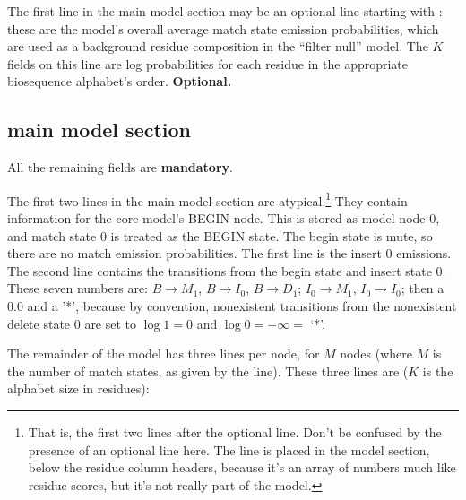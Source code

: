 \begin{sreitems}{}
\item [\monob{COMPO <f>*K}] The first line in the main model section
may be an optional line starting with : these are the
model's overall average match state emission probabilities, which are
used as a background residue composition in the ``filter null''
model. The $K$ fields on this line are log probabilities for each
residue in the appropriate biosequence alphabet's
order. \textbf{Optional.}

\end{sreitems}

\subsection{main model section}

All the remaining fields are \textbf{mandatory}.

The first two lines in the main model section are
atypical.\footnote{That is, the first two lines after the optional
   line. Don't be confused by the presence of an optional 
  line here. The  line is placed in the model section, below the
  residue column headers, because it's an array of numbers much like
  residue scores, but it's not really part of the model.}  They
contain information for the core model's BEGIN node. This is stored as
model node 0, and match state 0 is treated as the BEGIN state.  The
begin state is mute, so there are no match emission probabilities. The
first line is the insert 0 emissions. The second line contains the
transitions from the begin state and insert state 0.  These seven
numbers are: $B \rightarrow M_1$, $B \rightarrow I_0$, $B \rightarrow
D_1$; $I_0 \rightarrow M_1$, $I_0 \rightarrow I_0$; then a 0.0 and a
'*', because by convention, nonexistent transitions from the
nonexistent delete state 0 are set to $\log 1 = 0$ and $\log 0 =
-\infty = $ `*'.

The remainder of the model has three lines per node, for $M$ nodes
(where $M$ is the number of match states, as given by the 
line). These three lines are ($K$ is the alphabet size in residues):

